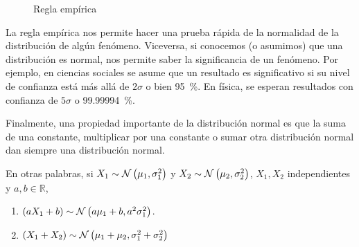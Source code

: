 \begin{figure}
\caption{Regla empírica}
\end{figure}

La regla empírica nos permite hacer una prueba rápida de la normalidad de la distribución de algún fenómeno. Viceversa, si conocemos (o asumimos) que una distribución es normal, nos permite saber la significancia de un fenómeno. Por ejemplo, en ciencias sociales se asume que un resultado es significativo si su nivel de confianza está más allá de \(2\sigma\) o bien \qty{95}{\percent}. En física, se esperan resultados con confianza de \(5\sigma\) o \qty{99.99994}{\percent}.

Finalmente, una propiedad importante de la distribución normal es que la suma de una constante, multiplicar por una constante o sumar otra distribución normal dan siempre una distribución normal.

\formal
En otras palabras, si \(X_1\sim\operatorname{\mathcal{N}}\left( \mu_1, \sigma_1^2 \right)\) y \(X_2\sim\operatorname{\mathcal{N}}\left( \mu_2, \sigma_2^2 \right)\), \(X_1, X_2\) independientes y \(a, b\in\mathbb{R}\), 
\begin{enumerate}
\item \(\left( aX_1 + b \right) \sim \operatorname{\mathcal{N}}\left( a\mu_1 + b, a^2\sigma_1^2 \right)\).
\item \(\left( X_1 + X_2 \right) \sim \operatorname{\mathcal{N}}\left( \mu_1 + \mu_2, \sigma_1^2 + \sigma_2^2 \right)\)
\end{enumerate}

